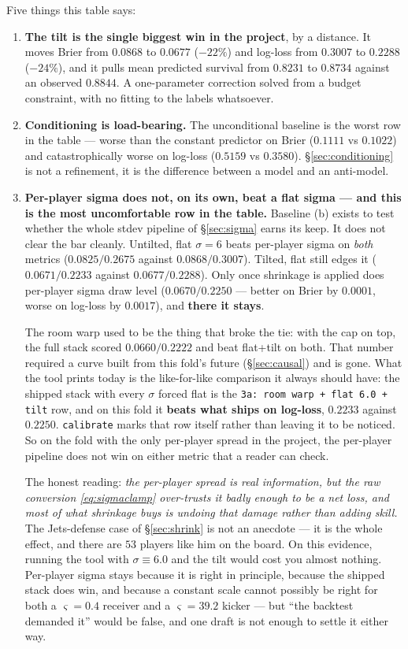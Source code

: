 \documentclass[10pt,a4paper]{article}
\theoremstyle{plain}
\theoremstyle{definition}
\theoremstyle{remark}
\newcommand{\code}[1]{\texttt{\small #1}}
\begin{document}
Five things this table says:

\begin{enumerate}
\item \textbf{The tilt is the single biggest win in the project}, by a distance. It moves
Brier from $0.0868$ to $0.0677$ ($-22\%$) and log-loss from $0.3007$ to $0.2288$
($-24\%$), and it pulls mean predicted survival from $0.8231$ to $0.8734$ against an
observed $0.8844$. A one-parameter correction solved from a budget constraint, with no
fitting to the labels whatsoever.

\item \textbf{Conditioning is load-bearing.} The unconditional baseline is the worst row
in the table --- worse than the constant predictor on Brier ($0.1111$ vs $0.1022$) and
catastrophically worse on log-loss ($0.5159$ vs $0.3580$). \S\ref{sec:conditioning} is
not a refinement, it is the difference between a model and an anti-model.

\item \textbf{Per-player sigma does not, on its own, beat a flat sigma --- and this is the
most uncomfortable row in the table.} Baseline (b) exists to test whether the whole stdev
pipeline of \S\ref{sec:sigma} earns its keep. It does not clear the bar cleanly. Untilted,
flat $\sigma = 6$ beats per-player sigma on \emph{both} metrics ($0.0825 / 0.2675$ against
$0.0868 / 0.3007$). Tilted, flat still edges it ($0.0671 / 0.2233$ against
$0.0677 / 0.2288$). Only once shrinkage is applied does per-player sigma draw level
($0.0670 / 0.2250$ --- better on Brier by $0.0001$, worse on log-loss by $0.0017$), and
\textbf{there it stays}.

The room warp used to be the thing that broke the tie: with the cap on top, the full
stack scored $0.0660 / 0.2222$ and beat flat+tilt on both. That number required a curve
built from this fold's future (\S\ref{sec:causal}) and is gone. What the tool prints today
is the like-for-like comparison it always should have: the shipped stack with every
$\sigma$ forced flat is the \code{3a: room warp + flat 6.0 + tilt} row, and on this fold it
\textbf{beats what ships on log-loss}, $0.2233$ against $0.2250$. \code{calibrate} marks
that row itself rather than leaving it to be noticed. So on the fold with the only
per-player spread in the project, the per-player pipeline does not win on either metric that
a reader can check.

The honest reading: \emph{the per-player spread is real information, but the raw
conversion \eqref{eq:sigmaclamp} over-trusts it badly enough to be a net loss, and most of
what shrinkage buys is undoing that damage rather than adding skill.} The Jets-defense
case of \S\ref{sec:shrink} is not an anecdote --- it is the whole effect, and there are
$53$ players like him on the board. On this evidence, running the tool with
$\sigma \equiv 6.0$ and the tilt would cost you almost nothing. Per-player sigma stays
because it is right in principle, because the shipped stack does win, and because a
constant scale cannot possibly be right for both a $\varsigma = 0.4$ receiver and a
$\varsigma = 39.2$ kicker --- but ``the backtest demanded it'' would be false, and one
draft is not enough to settle it either way.


\end{enumerate}
\end{document}
